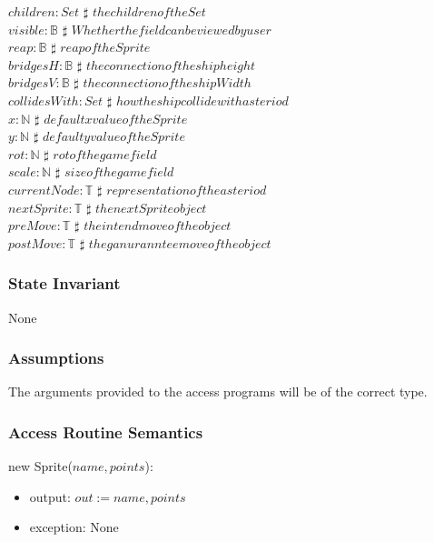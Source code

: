 \documentclass[12pt]{article}
\begin{document}
$children: Set$ $\sharp$ $the children of the Set$\\
$visible: \mathbb{B}$ $\sharp$ $Whether the field can be viewed by user$\\
$reap: \mathbb{B}$ $\sharp$ $reap of the Sprite$\\
$bridgesH: \mathbb{B}$ $\sharp$ $the connection of the ship height$\\
$bridgesV: \mathbb{B}$ $\sharp$ $the connection of the ship Width$\\
$collidesWith: Set$ $\sharp$ $how the ship collide with asteriod$\\
$x: \mathbb{N}$ $\sharp$ $default x value of the Sprite$\\
$y: \mathbb{N}$ $\sharp$ $default y value of the Sprite$\\
$rot: \mathbb{N}$ $\sharp$ $rot of the game field$\\
$scale: \mathbb{N}$ $\sharp$ $size of the game field$\\
$currentNode: \mathbb{T}$ $\sharp$ $representation of the asteriod$\\
$nextSprite: \mathbb{T}$ $\sharp$ $the next Sprite object$\\
$preMove: \mathbb{T}$ $\sharp$ $the intend move of the object$\\
$postMove: \mathbb{T}$ $\sharp$ $the ganuranntee move of the object$\\


\subsubsection* {State Invariant}
None

\subsubsection* {Assumptions}

The arguments provided to the access programs will be of the correct type.

\subsubsection* {Access Routine Semantics}

\noindent new Sprite($name, points$):
\begin{itemize}
\item output: $out := name, points$
\item exception: None
\end{itemize}
\end{document}
